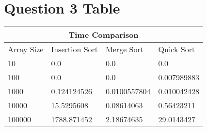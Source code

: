 \documentclass[12pt]{article}
\begin{document}
\section*{Question 3 Table}



\begin{tabular}{ |p{3cm}||p{3cm}|p{3cm}|p{3cm}|  }
 \hline
 \multicolumn{4}{|c|}{Time Comparison} \\
 \hline
 Array Size & Insertion Sort & Merge Sort & Quick Sort\\
 \hline
 10   & 0.0    &0.0&   0.0\\
 100 &   0.0  & 0.0   &0.007989883\\
 1000 &0.124124526 & 0.0100557804&  0.010042428\\
 10000    &15.5295608 & 0.08614063&   0.56423211\\
 100000&   1788.871452  & 2.18674635&29.0143427\\

 \hline
\end{tabular}
\end{document}
